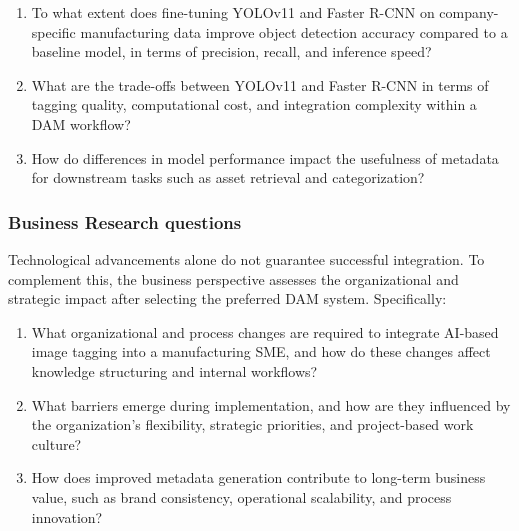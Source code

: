 \documentclass[a4paper,10pt,twocolumn]{article}
\numberwithin{figure}{section}
\numberwithin{table}{section}
\begin{document}
\begin{enumerate}[label=(\alph*)]
    \item To what extent does fine-tuning YOLOv11 and 
    Faster R-CNN on company-specific manufacturing data 
    improve object detection accuracy compared to a 
    baseline model, in terms of precision, recall, 
    and inference speed?

    \item What are the trade-offs between YOLOv11 and 
    Faster R-CNN in terms of tagging quality, computational
    cost, and integration complexity within a DAM workflow?
    
    \item How do differences in model performance impact the 
    usefulness of metadata for downstream tasks such as asset 
    retrieval and categorization?

\end{enumerate}

\subsubsection{Business Research questions}
\vspace{0.3cm}
Technological advancements alone do not guarantee successful integration. To complement this,
the business perspective assesses the organizational and strategic impact after selecting the preferred DAM system. Specifically:

\begin{enumerate}[label=(\alph*), resume]
    \item What organizational and process changes are 
    required to integrate AI-based image tagging into a manufacturing 
    SME, and how do these changes affect knowledge structuring and 
    internal workflows?
    
    \item What barriers emerge during implementation, and how are they
    influenced by the organization’s flexibility, strategic priorities, 
    and project-based work culture?

    \item How does improved metadata generation contribute to long-term 
    business value, such as brand consistency, operational scalability, and process innovation?
    
\end{enumerate}   
\end{document}
